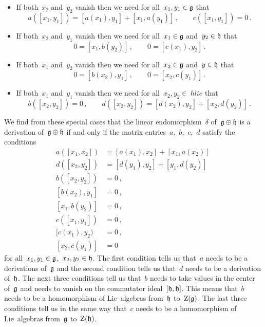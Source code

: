 \begin{example}
\begin{itemize}
		\item
			If both~$x_2$ and~$y_2$ vanish then we need for all~$x_1, y_1 \in \mathfrak{g}$ that
			\[
				a( [x_1, y_1] )
				=
				[a(x_1), y_1] + [x_1, a(y_1)] \,,
				\qquad
				c( [x_1, y_1] )
				=
				0 \,.
			\]
		\item
			If both~$x_2$ and~$y_1$ vanish then we need for all~$x_1 \in \mathfrak{g}$ and~$y_2 \in \mathfrak{h}$ that
			\[
				0
				=
				[ x_1, b(y_2) ] \,,
				\qquad
				0
				=
				[ c(x_1), y_2 ] \,.
			\]
		\item
			If both~$x_1$ and~$y_2$ vanish then we need for all~$x_2 \in \mathfrak{g}$ and~$y \in \mathfrak{h}$ that
			\[
				0
				=
				[ b(x_2), y_1 ] \,,
				\qquad
				0
				=
				[ x_2, c(y_1) ] \,.
			\]
		\item
			If both~$x_1$ and~$y_1$ vanish then we need for all~$x_2, y_2 \in \ hlie$ that
			\[
				b( [x_2, y_2] )
				=
				0 \,,
				\qquad
				d( [x_2, y_2] )
				=
				[ d(x_2), y_2 ] + [ x_2, d(y_2) ] \,.
			\]
	\end{itemize}
	We find from these special cases that the linear endomorphism~$\delta$ of~$\mathfrak{g} \oplus \mathfrak{h}$ is a derivation of~$\mathfrak{g} \oplus \mathfrak{h}$ if and only if the matrix entries~$a$,~$b$,~$c$,~$d$ satisfy the conditions
	\begin{align*}
		a( [x_1, x_2] ) &= [ a(x_1), x_2 ] + [ x_1, a(x_2) ] \,\\
		d( [x_2, y_2] ) &= [ d(y_1), y_2 ] + [ y_1, d(y_2) ] \,\\
		b( [x_2, y_2] ) &= 0 \,, \\
		[ b(x_2), y_1]  &= 0 \,, \\
		[ x_1, b(y_2) ] &= 0 \,, \\
		c( [x_1, y_1] ) &= 0 \,, \\
		[ c(x_1), y_2 ) &= 0 \,, \\
		[ x_2, c(y_1) ] &= 0
	\end{align*}
	for all~$x_1, y_1 \in \mathfrak{g}$,~$x_2, y_2 \in \mathfrak{h}$.
	The first condition tells us that~$a$ needs to be a derivations of~$\mathfrak{g}$ and the second condition tells us that~$d$ needs to be a derivation of~$\mathfrak{h}$.
	The next three conditions tell us that~$b$ needs to take values in the center of~$\mathfrak{g}$ and needs to vanish on the commutator ideal~$[\mathfrak{h}, \mathfrak{h}]$.
	This means that~$b$ needs to be a homomorphism of Lie~algebras from~$\mathfrak{h}$ to~$\operatorname{Z}(\mathfrak{g})$.
	The last three conditions tell us in the same way that~$c$ needs to be a homomorphism of Lie~algebras from~$\mathfrak{g}$ to~$\operatorname{Z}(\mathfrak{h})$.


\end{example}
